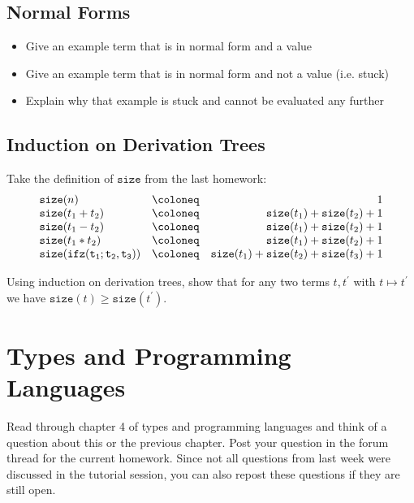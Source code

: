 \subsection*{Normal Forms}

\begin{itemize}
  \item Give an example term that is in normal form and a value
  \item Give an example term that is in normal form and not a value (i.e. stuck)
  \item Explain why that example is stuck and cannot be evaluated any further 
\end{itemize}

\subsection*{Induction on Derivation Trees}
Take the definition of $\mathtt{size}$ from the last homework:
\[
\begin{array}{l c r}
\mathtt{size}(n) & \coloneq&  1\\
\mathtt{size}(t_1+t_2) &\coloneq& \mathtt{size}(t_1)+\mathtt{size}(t_2) + 1\\
\mathtt{size}(t_1-t_2) &\coloneq& \mathtt{size}(t_1)+\mathtt{size}(t_2) + 1\\
\mathtt{size}(t_1*t_2) &\coloneq& \mathtt{size}(t_1)+\mathtt{size}(t_2) + 1\\
\mathtt{size}(\mathtt{ifz(t_1;t_2,t_3)}) &\coloneq& \mathtt{size}(t_1)+\mathtt{size}(t_2)+\mathtt{size}(t_3) + 1
\end{array}
\]

Using induction on derivation trees, show that for any two terms $t,t^{\prime}$ with $t\mapsto t^{\prime}$ we have $\mathtt{size}(t) \geq \mathtt{size}(t^{\prime})$.

\section*{Types and Programming Languages}
Read through chapter 4 of types and programming languages and think of a question about this or the previous chapter.
Post your question in the forum thread for the current homework.
Since not all questions from last week were discussed in the tutorial session, you can also repost these questions if they are still open.
